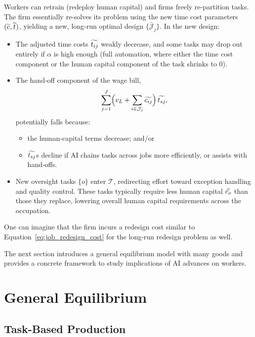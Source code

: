 \documentclass{article}
\theoremstyle{plain}
\theoremstyle{plain}
\begin{document}
Workers can retrain (redeploy human capital) and firms freely re‐partition tasks.
The firm essentially re-solves its problem using the new time cost parameters \((\widetilde{c_{}}, \widetilde{t_{}})\), yielding a new, long-run optimal design \(\{\widetilde{\mathcal{J}_j}\}\).  
In the new design:
\begin{itemize}
  \item The adjusted time costs \(\widetilde{t_{ij}}\) weakly decrease, and some tasks may drop out entirely if $\alpha$ is high enough (full automation, where either the time cost component or the human capital component of the task shrinks to 0).
  \item The hand‐off component of the wage bill,
  \[
    \sum_{j=1}^J \Bigl(v_L + \sum_{i\in\mathcal{J}_j}\widetilde{c_{ij}}\Bigr)\,\widetilde{t_{sj}},
  \]
  potentially falls because:
  \begin{itemize}
    \item the human‐capital terms decrease; and/or
    \item \(\widetilde{t_{sj}}\)s decline if AI chains tasks across jobs more efficiently, or assists with hand‐offs.
  \end{itemize}
  \item New oversight tasks \(\{o\}\) enter \(\mathcal{T}\), redirecting effort toward exception handling and quality control. These tasks typically require less human capital \(\widetilde{c_{o}}\) than those they replace, lowering overall human capital requirements across the occupation.
\end{itemize}
One can imagine that the firm incurs a redesign cost similar to Equation~\ref{eq:job_redesign_cost} for the long-run redesign problem as well.

The next section introduces a general equilibrium model with many goods and provides a concrete framework to study implications of AI advances on workers.


\section{General Equilibrium}
\label{sec:GE}

\subsection{Task-Based Production}
\label{sec:prod_GE}
\end{document}
